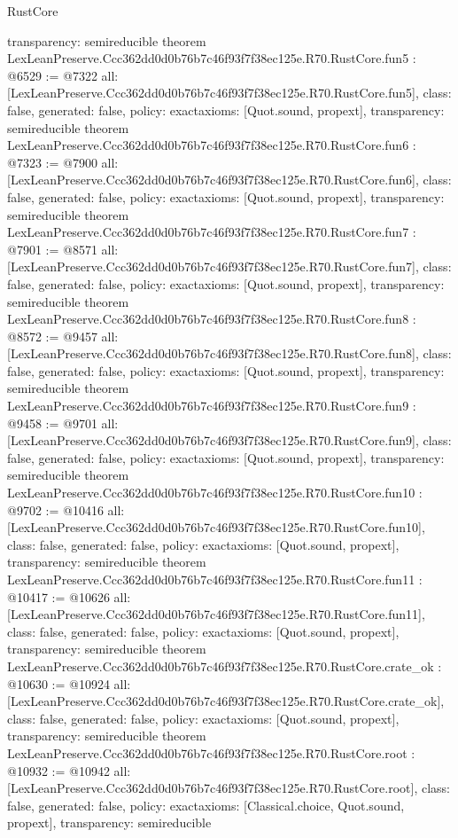 \begin{lexlean}{RustCore}
\begin{coremodule}
{  transparency: semireducible
}
theorem LexLeanPreserve.Ccc362dd0d0b76b7c46f93f7f38ec125e.R70.RustCore.fun5 : @6529 := @7322 {
  all: [LexLeanPreserve.Ccc362dd0d0b76b7c46f93f7f38ec125e.R70.RustCore.fun5],
  class: false,
  generated: false,
  policy: exact{axioms: [Quot.sound, propext]},
  transparency: semireducible
}
theorem LexLeanPreserve.Ccc362dd0d0b76b7c46f93f7f38ec125e.R70.RustCore.fun6 : @7323 := @7900 {
  all: [LexLeanPreserve.Ccc362dd0d0b76b7c46f93f7f38ec125e.R70.RustCore.fun6],
  class: false,
  generated: false,
  policy: exact{axioms: [Quot.sound, propext]},
  transparency: semireducible
}
theorem LexLeanPreserve.Ccc362dd0d0b76b7c46f93f7f38ec125e.R70.RustCore.fun7 : @7901 := @8571 {
  all: [LexLeanPreserve.Ccc362dd0d0b76b7c46f93f7f38ec125e.R70.RustCore.fun7],
  class: false,
  generated: false,
  policy: exact{axioms: [Quot.sound, propext]},
  transparency: semireducible
}
theorem LexLeanPreserve.Ccc362dd0d0b76b7c46f93f7f38ec125e.R70.RustCore.fun8 : @8572 := @9457 {
  all: [LexLeanPreserve.Ccc362dd0d0b76b7c46f93f7f38ec125e.R70.RustCore.fun8],
  class: false,
  generated: false,
  policy: exact{axioms: [Quot.sound, propext]},
  transparency: semireducible
}
theorem LexLeanPreserve.Ccc362dd0d0b76b7c46f93f7f38ec125e.R70.RustCore.fun9 : @9458 := @9701 {
  all: [LexLeanPreserve.Ccc362dd0d0b76b7c46f93f7f38ec125e.R70.RustCore.fun9],
  class: false,
  generated: false,
  policy: exact{axioms: [Quot.sound, propext]},
  transparency: semireducible
}
theorem LexLeanPreserve.Ccc362dd0d0b76b7c46f93f7f38ec125e.R70.RustCore.fun10 : @9702 := @10416 {
  all: [LexLeanPreserve.Ccc362dd0d0b76b7c46f93f7f38ec125e.R70.RustCore.fun10],
  class: false,
  generated: false,
  policy: exact{axioms: [Quot.sound, propext]},
  transparency: semireducible
}
theorem LexLeanPreserve.Ccc362dd0d0b76b7c46f93f7f38ec125e.R70.RustCore.fun11 : @10417 := @10626 {
  all: [LexLeanPreserve.Ccc362dd0d0b76b7c46f93f7f38ec125e.R70.RustCore.fun11],
  class: false,
  generated: false,
  policy: exact{axioms: [Quot.sound, propext]},
  transparency: semireducible
}
theorem LexLeanPreserve.Ccc362dd0d0b76b7c46f93f7f38ec125e.R70.RustCore.crate_ok : @10630 := @10924 {
  all: [LexLeanPreserve.Ccc362dd0d0b76b7c46f93f7f38ec125e.R70.RustCore.crate_ok],
  class: false,
  generated: false,
  policy: exact{axioms: [Quot.sound, propext]},
  transparency: semireducible
}
theorem LexLeanPreserve.Ccc362dd0d0b76b7c46f93f7f38ec125e.R70.RustCore.root : @10932 := @10942 {
  all: [LexLeanPreserve.Ccc362dd0d0b76b7c46f93f7f38ec125e.R70.RustCore.root],
  class: false,
  generated: false,
  policy: exact{axioms: [Classical.choice, Quot.sound, propext]},
  transparency: semireducible
}


\end{coremodule}
\end{lexlean}
